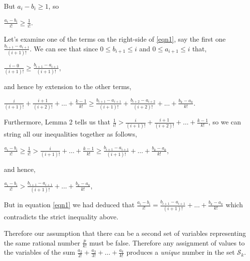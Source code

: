 \documentclass{article}
\begin{document}
But \(a_i - b_i \ge{} 1\), so

\begin{center}
\(\frac{a_i - b_i}{i!} \ge{} \frac{1}{i!}\).
\end{center}

% 
Let's examine
one of the terms
on the right-side of \eqref{eqn1}, say
the first one \(\frac{b_{i+1} - a_{i+1}}{(i+1)!}\). We can see that since
\(0 \le b_{i+1} \le{} i\) and \(0 \le a_{i+1} \le{} i\) that,

\begin{center}
\(\frac{i - 0}{(i+1)!} \ge{} \frac{b_{i+1} - a_{i+1}}{(i+1)!}\),
\end{center}

and hence by extension to the other terms,

\begin{center}
\(
\frac{i}{(i+1)!}
+ \frac{i+1}{(i+2)!}
+ \dots{} + \frac{k-1}{k!} \ge{}
\frac{b_{i+1} - a_{i+1}}{(i+1)!}
+ \frac{b_{i+2} - a_{i+2}}{(i+2)!}
+ \dots{} + \frac{b_k - a_k}{k!}\).
\end{center}

Furthermore, Lemma 2 tells us that \(\frac{1}{i!} > 
\frac{i}{(i+1)!}
+ \frac{i+1}{(i+2)!}
+ \dots{} + \frac{k-1}{k!}\), so
we can string all our inequalities together as follows,

\begin{center}
\(\frac{a_i - b_i}{i!} \ge{} \frac{1}{i!} > \frac{i}{(i+1)!} + \dots{} + \frac{k-1}{k!} \ge{} \frac{b_{i+1} - a_{i+1}}{(i+1)!} + \dots{} + \frac{b_k - a_k}{k!}\),
\end{center}

and hence,

\begin{center}
\(\frac{a_i - b_i}{i!} > \frac{b_{i+1} - a_{i+1}}{(i+1)!} + \dots{} + \frac{b_k - a_k}{k!}\),
\end{center}

But in equation \eqref{eqn1} we had deduced
that \(\frac{a_i - b_i}{i!} = \frac{b_{i+1} - a_{i+1}}{(i+1)!} + \dots{} + \frac{b_k - a_k}{k!}\)
which contradicts the strict inequality above.

Therefore our assumption that there can be a second set
of variables representing the same rational number \(\frac{p}{k!}\) must be false.
Therefore any assignment of values to the variables of the sum
\(\frac{a_2}{2!} + \frac{a_3}{3!} + \dots{} + \frac{a_k}{k!}\)
produces a \emph{unique} number in the set \(\mathcal{S}_k\).
\end{document}
